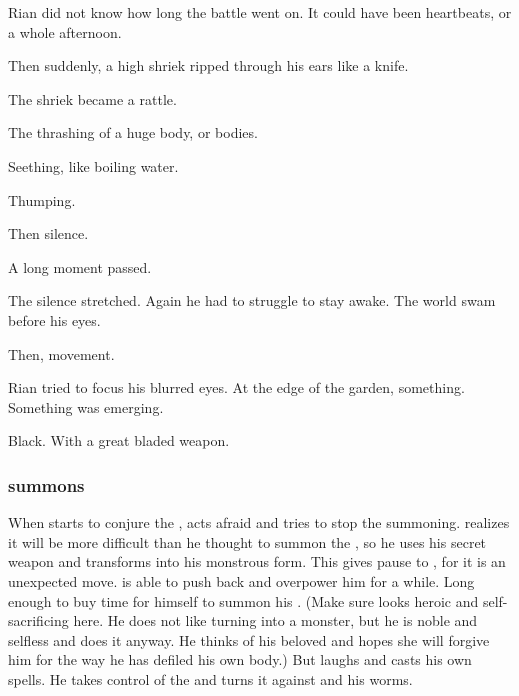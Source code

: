 {  Rian did not know how long the battle went on. It could have been heartbeats, or a whole afternoon.  
  
  Then suddenly, a high shriek ripped through his ears like a knife. 
  
  The shriek became a rattle. 
  
  The thrashing of a huge body, or bodies.
  
  Seething, like boiling water. 
  
  Thumping. 
  
  Then silence. 
  
  A long moment passed. 
  
  
  The silence stretched. Again he had to struggle to stay awake. The world swam before his eyes. 
  
  Then, movement. 
  
  Rian tried to focus his blurred eyes. At the edge of the garden, something. Something was emerging. 
  
  Black. With a great bladed weapon. 
  
}





\subsubsection{\Teshrial summons \malgryph}
When \Teshrial starts to conjure the \malgryph, \Ishnaruchaefir acts afraid and tries to stop the summoning.
\Teshrial realizes it will be more difficult than he thought to summon the \malgryph, so he uses his secret weapon and transforms into his monstrous form.
This gives pause to \Ishnaruchaefir, for it is an unexpected move. 
\Teshrial is able to push back \Ishnaruchaefir and overpower him for a while. 
Long enough to buy time for himself to summon his \malgryph.
(Make sure \Teshrial looks heroic and self-sacrificing here. He does not like turning into a monster, but he is noble and selfless and does it anyway. He thinks of his beloved and hopes she will forgive him for the way he has defiled his own body.)
But \Ishnaruchaefir laughs and casts his own spells.
He takes control of the \malgryph and turns it against \Teshrial and his worms.





